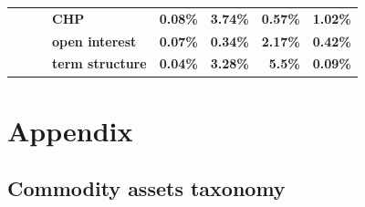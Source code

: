 \documentclass[
  authoryear,
  preprint,
  3p]{elsarticle}
\begin{document}
\begin{longtable}[t]{>{}l>{}l>{}l>{}l>{}r>{}r>{}r>{}r}
\textbf{} & \textbf{} & \textbf{} & \textbf{CHP} & \textcolor[HTML]{4285f4}{\textbf{0.08\%}} & \textcolor[HTML]{4285f4}{\textbf{3.74\%}} & \textcolor[HTML]{4285f4}{\textbf{0.57\%}} & \textcolor[HTML]{4285f4}{\textbf{1.02\%}}\\
\addlinespace
\textbf{} & \textbf{} & \textbf{} & \textbf{open interest} & \textcolor[HTML]{4285f4}{\textbf{0.07\%}} & \textcolor[HTML]{4285f4}{\textbf{0.34\%}} & \textcolor[HTML]{4285f4}{\textbf{2.17\%}} & \textcolor[HTML]{4285f4}{\textbf{0.42\%}}\\
\textbf{} & \textbf{} & \textbf{} & \textbf{term structure} & \textcolor[HTML]{4285f4}{\textbf{0.04\%}} & \textcolor[HTML]{4285f4}{\textbf{3.28\%}} & \textcolor[HTML]{4285f4}{\textbf{5.5\%}} & \textcolor[HTML]{4285f4}{\textbf{0.09\%}}\\
\bottomrule

\end{longtable}

\endgroup{}

\restoregeometry

\newpage

\section*{Appendix}\label{appendix}

\subsection{Commodity assets taxonomy}\label{sec-taxonomy}

\begingroup\fontsize{7}{9}\selectfont
\end{document}
